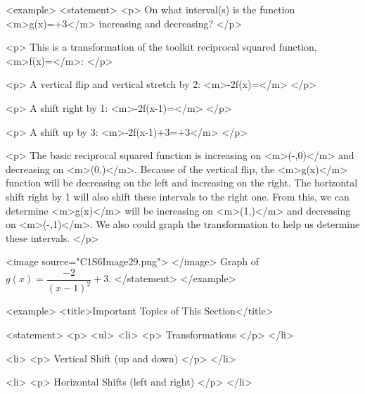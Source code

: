         <example>
            <statement>
                <p>
                    On what interval(s) is the function <m>g(x)=+3</m> increasing and decreasing?
                </p>

                <p>
                    This is a transformation of the toolkit reciprocal squared function, <m>f(x)=</m>:
                </p>

                <p>
                    A vertical flip and vertical stretch by 2: <m>-2f(x)=</m>
                </p>

                <p>
                    A shift right by 1: <m>-2f(x-1)=</m>
                </p>

                <p>
                    A shift up by 3: <m>-2f(x-1)+3=+3</m>
                </p>

                <p>
                    The basic reciprocal squared function is increasing on <m>(-\infty,0)</m> and decreasing on <m>(0,\infty)</m>.
                    Because of the vertical flip, the <m>g(x)</m> function will be decreasing on the left and increasing on the right.
                    The horizontal shift right by 1 will also shift these intervals to the right one.
                    From this, we can determine <m>g(x)</m> will be increasing on <m>(1,\infty)</m> and decreasing on <m>(-\infty,1)</m>.
                    We also could graph the transformation to help us determine these intervals.
                </p>

                <image source="C1S6Image29.png">
                </image>
                Graph of $g(x)=\dfrac{-2}{(x-1)^2}+3$.
            </statement>
        </example>

        <example>
            <title>Important Topics of This Section</title>

            <statement>
                <p>
                    <ul>
                        <li>
                            <p>
                                Transformations
                            </p>
                        </li>

                        <li>
                            <p>
                                Vertical Shift (up and down)
                            </p>
                        </li>

                        <li>
                            <p>
                                Horizontal Shifts (left and right)
                            </p>
                        </li>

